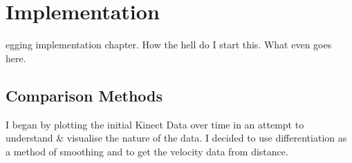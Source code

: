 %
%
\let\textcircled=\pgftextcircled
\chapter{Implementation}
\label{chap:intro}

egging implementation chapter. How the hell do I start this. What even goes here.

\section{Comparison Methods}
\label{sec:sec01}


I began by plotting the initial Kinect Data over time in an attempt to understand \& visualise the nature of the data. I decided to use differentiation as a method of smoothing and to get the velocity data from distance.


